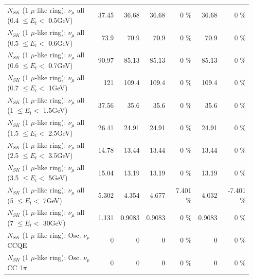 \begin{table}
\begin{tabular}{| l | r | r | r  r | r  r |}
       $N_{SK}$ (1 $\mu$-like ring): $\nu_{\mu}$ all (0.4 $\leq E_{t} <$ 0.5GeV) &           37.45 &           36.68 &           36.68 &        0 \%  &           36.68 &        0 \%  \\ 
       $N_{SK}$ (1 $\mu$-like ring): $\nu_{\mu}$ all (0.5 $\leq E_{t} <$ 0.6GeV) &            73.9 &            70.9 &            70.9 &        0 \%  &            70.9 &        0 \%  \\ 
       $N_{SK}$ (1 $\mu$-like ring): $\nu_{\mu}$ all (0.6 $\leq E_{t} <$ 0.7GeV) &           90.97 &           85.13 &           85.13 &        0 \%  &           85.13 &        0 \%  \\ 
         $N_{SK}$ (1 $\mu$-like ring): $\nu_{\mu}$ all (0.7 $\leq E_{t} <$ 1GeV) &             121 &           109.4 &           109.4 &        0 \%  &           109.4 &        0 \%  \\ 
         $N_{SK}$ (1 $\mu$-like ring): $\nu_{\mu}$ all (1 $\leq E_{t} <$ 1.5GeV) &           37.56 &            35.6 &            35.6 &        0 \%  &            35.6 &        0 \%  \\ 
       $N_{SK}$ (1 $\mu$-like ring): $\nu_{\mu}$ all (1.5 $\leq E_{t} <$ 2.5GeV) &           26.41 &           24.91 &           24.91 &        0 \%  &           24.91 &        0 \%  \\ 
       $N_{SK}$ (1 $\mu$-like ring): $\nu_{\mu}$ all (2.5 $\leq E_{t} <$ 3.5GeV) &           14.78 &           13.44 &           13.44 &        0 \%  &           13.44 &        0 \%  \\ 
         $N_{SK}$ (1 $\mu$-like ring): $\nu_{\mu}$ all (3.5 $\leq E_{t} <$ 5GeV) &           15.04 &           13.19 &           13.19 &        0 \%  &           13.19 &        0 \%  \\ 
           $N_{SK}$ (1 $\mu$-like ring): $\nu_{\mu}$ all (5 $\leq E_{t} <$ 7GeV) &           5.302 &           4.354 &           4.677 &    7.401 \%  &           4.032 &   -7.401 \%  \\ 
          $N_{SK}$ (1 $\mu$-like ring): $\nu_{\mu}$ all (7 $\leq E_{t} <$ 30GeV) &           1.131 &          0.9083 &          0.9083 &        0 \%  &          0.9083 &        0 \%  \\ 
\hline
\hline
                               $N_{SK}$ (1 $\mu$-like ring): Osc. $\nu_\mu$ CCQE &               0 &               0 &               0 &        0 \%  &               0 &        0 \%  \\ 
                          $N_{SK}$ (1 $\mu$-like ring): Osc. $\nu_\mu$ CC 1$\pi$ &               0 &               0 &               0 &        0 \%  &               0 &        0 \%  \\ 

\end{tabular}
\end{table}
